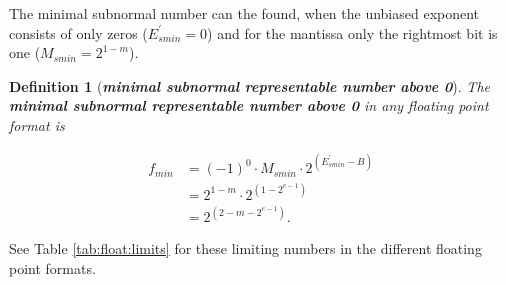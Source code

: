 \documentclass{article}
\theoremstyle{plain} %
\newtheorem{definition}{Definition}[section]
\theoremstyle{convention} %
\theoremstyle{remark} %
\def\df#1{\textbf{\textit{#1}}}
\numberwithin{equation}{section}
\begin{document}
The minimal subnormal number can the found, when the unbiased exponent consists of only zeros ($E^{\prime}_{smin} = 0$) and for the mantissa only the rightmost bit is one ($M_{smin} = 2^{1-m}$).

\begin{definition}[\df{minimal subnormal representable number above \num{0}}]

The \df{minimal subnormal representable number above \num{0}} in any floating point format is

\begin{align*}
    f_{min} &= (-1)^0 \cdot M_{smin} \cdot 2^{(E^{\prime}_{smin} - B)} \\
            &= 2^{1-m} \cdot 2^{(1 - 2^{e-1})} \\
            &= 2^{(2 -m -2^{e-1})}.
\end{align*}

\end{definition}

See Table \ref{tab:float:limits} for these limiting numbers in the different floating point formats.
\end{document}
